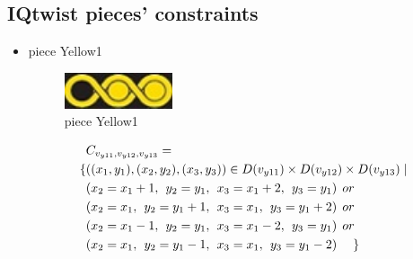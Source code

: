 \begin{appendices}
\renewcommand\thechapter{}
\renewcommand\thesection{\arabic{section}}
\renewcommand\thesubsection{\thesection.\arabic{subsection}}
\renewcommand\thefigure{\arabic{figure}}
\renewcommand\thetable{\arabic{table}}
\section{IQtwist pieces' constraints}
\label{appendix:2Dpieces}
\begin{itemize}
  \item piece Yellow1\\
\begin{figure}[H]
    \centering
    \includegraphics[width=0.3\textwidth]{figs/yellow1.jpg}
    \caption{piece Yellow1}
\end{figure}
  \begin{align*}
&C_{v_{y11},v_{y12},v_{y13}}=\\
\{&((x_{1},y_{1}),(x_{2},y_{2}),(x_{3},y_{3}))\in D(v_{y11})\times D(v_{y12})\times D(v_{y13})\mid\\
&(x_{2} = x_{1} + 1,\hspace{1ex}y_{2} = y_{1},\hspace{1ex}x_{3} = x_{1} + 2, \hspace{1ex}y_{3} = y_{1})\hspace{1ex} or\\
&(x_{2} = x_{1},\hspace{1ex}y_{2} = y_{1}+1,\hspace{1ex}x_{3} = x_{1}, \hspace{1ex}y_{3} = y_{1}+2)\hspace{1ex} or\\
&(x_{2} = x_{1}-1,\hspace{1ex}y_{2} = y_{1},\hspace{1ex}x_{3} = x_{1}-2,\hspace{1ex} y_{3} = y_{1})\hspace{1ex} or\\
&(x_{2} = x_{1},\hspace{1ex}y_{2} = y_{1}-1,\hspace{1ex}x_{3} = x_{1}, \hspace{1ex}y_{3} = y_{1}-2)\hspace{3ex} \}
\end{align*} 

\end{itemize}
\end{appendices}
